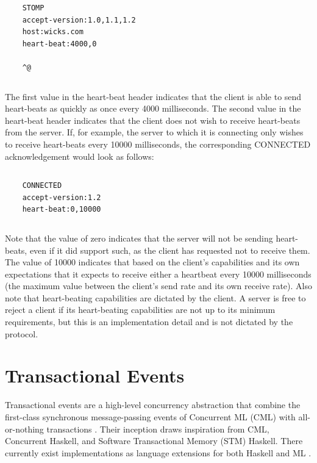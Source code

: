 \documentclass[conference, letterpaper]{IEEEtran}
\begin{document}
\begin{verbatim}
\end{verbatim}
\begin{verbatim}
    STOMP
    accept-version:1.0,1.1,1.2
    host:wicks.com
    heart-beat:4000,0
    
    ^@
\end{verbatim}
\begin{verbatim}
\end{verbatim}

The first value in the heart-beat header indicates that the client is able to send heart-beats as quickly as once every 4000 milliseconds.  The second value in the heart-beat header indicates that the client does not wish to receive heart-beats from the server. If, for example, the server to which it is connecting only wishes to receive heart-beats every 10000 milliseconds, the corresponding CONNECTED acknowledgement would look as follows:


\begin{verbatim}
\end{verbatim}
\begin{verbatim}
    CONNECTED
    accept-version:1.2
    heart-beat:0,10000
\end{verbatim}
\begin{verbatim}
\end{verbatim}

Note that the value of zero indicates that the server will not be sending heart-beats, even if it did support such, as the client has requested not to receive them. The value of 10000 indicates that based on the client's capabilities and its own expectations that it expects to receive either a heartbeat every 10000 milliseconds (the maximum value between the client's send rate and its own receive rate). Also note that heart-beating capabilities are dictated by the client. A server is free to reject a client if its heart-beating capabilities are not up to its minimum requirements, but this is an implementation detail and is not dictated by the protocol.

\section{Transactional Events}


Transactional events are a high-level concurrency abstraction that combine the first-class synchronous message-passing events of Concurrent ML (CML) with all-or-nothing transactions \cite{te:original}. Their inception draws inspiration from CML, Concurrent Haskell, and Software Transactional Memory (STM) Haskell. There currently exist implementations as language extensions for both Haskell \cite{te:original} and ML \cite{te:ml}.
\end{document}

